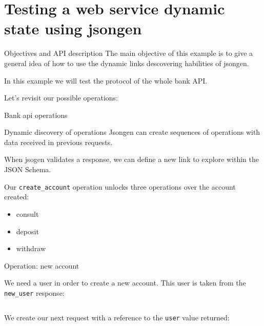 \section{Testing a web service dynamic state using jsongen}

\begin{frame}{Objectives and API description}%
  The main objective of this example is to give a general idea of how
  to use the dynamic links descovering habilities of jsongen.

  In this example we will test the protocol of the whole bank API.%

  Let's revisit our possible operations:%
\end{frame}

\begin{frame}{Bank api operations}
  \begin{figure}
    \centering
  \end{figure}
\end{frame}

\begin{frame}{Dynamic discovery of operations}%
  Jsongen can create sequences of operations with data received in
  previous requests.

  When jsogen validates a response, we can define a new link to
  explore within the JSON Schema.

  Our \texttt{create\_account} operation unlocks three operations over
  the account created:%
  \begin{itemize}
  \item consult
  \item deposit
  \item withdraw
  \end{itemize}
\end{frame}

\begin{frame}{Operation: new account}

  We need a user in order to create a new account. This user is taken
  from the \texttt{new\_user} response:

  \centering
  \inputminted{js}{./code/example2_user_response-gen.jsch}

  \pause

  We create our next request with a reference to the \texttt{user}
  value returned:

  \centering
  \inputminted{js}{./code/example2_new_account.jsch}
\end{frame}

